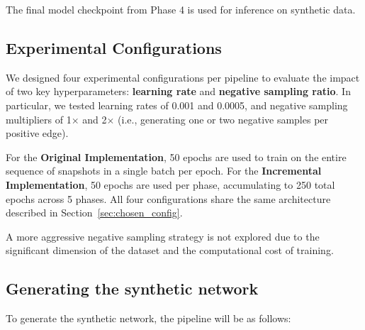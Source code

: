 The final model checkpoint from Phase 4 is used for inference on synthetic data.

\subsection*{Experimental Configurations}

We designed four experimental configurations per pipeline to evaluate the impact of two key hyperparameters: \textbf{learning rate} and \textbf{negative sampling ratio}. In particular, we tested learning rates of 0.001 and 0.0005, and negative sampling multipliers of 1$\times$ and 2$\times$ (i.e., generating one or two negative samples per positive edge).

For the \textbf{Original Implementation}, 50 epochs are used to train on the entire sequence of snapshots in a single batch per epoch. For the \textbf{Incremental Implementation}, 50 epochs are used per phase, accumulating to 250 total epochs across 5 phases. All four configurations share the same architecture described in Section~\ref{sec:chosen_config}.

A more aggressive negative sampling strategy is not explored due to the significant dimension of the dataset and the computational cost of training.

\subsection{Generating the synthetic network}

To generate the synthetic network, the pipeline will be as follows:

